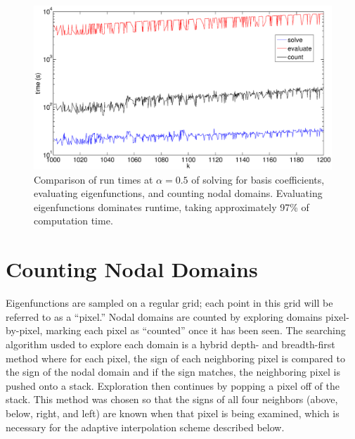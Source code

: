 \documentclass{report}
\begin{document}
\begin{figure}
  \begin{center}
    \includegraphics[width=\textwidth]{figs/timing/timing_comp_1000_to_1200.eps}
    \caption{Comparison of run times at $\alpha = 0.5$ of solving for basis coefficients, evaluating eigenfunctions, and counting nodal domains. Evaluating eigenfunctions dominates runtime, taking approximately 97\% of computation time.}
    \label{fig:timing}
  \end{center}
\end{figure}


\section{Counting Nodal Domains}
\label{sec:counting}
Eigenfunctions are sampled on a regular grid; each point in this grid will be referred to as a ``pixel.'' Nodal domains are counted by exploring domains pixel-by-pixel, marking each pixel as ``counted'' once it has been seen. The searching algorithm usded to explore each domain is a hybrid depth- and breadth-first method where for each pixel, the sign of each neighboring pixel is compared to the sign of the nodal domain and if the sign matches, the neighboring pixel is pushed onto a stack. Exploration then continues by popping a pixel off of the stack. This method was chosen so that the signs of all four neighbors (above, below, right, and left) are known when that pixel is being examined, which is necessary for the adaptive interpolation scheme described below.
\end{document}
